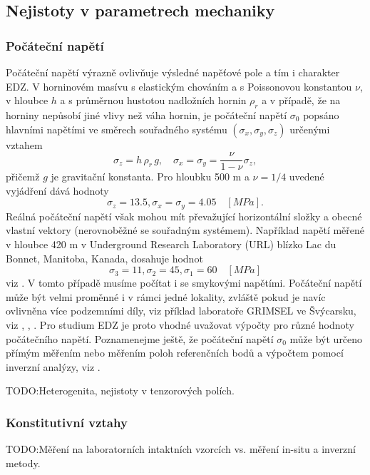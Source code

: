\documentclass{article}
\def\todo#1{{TODO:\color{violet}#1}}
\begin{document}
\subsection{Nejistoty v parametrech mechaniky}

\subsubsection{Počáteční napětí}
\label{sec:sigma0}
Počáteční napětí výrazně ovlivňuje výsledné napěťové pole a tím i charakter EDZ.
V horninovém masívu s elastickým chováním a s Poissonovou konstantou $\nu$, v hloubce $h$ a s průměrnou hustotou nadložních hornin $\rho_{r}$ a v případě,
že na horniny nepůsobí jiné vlivy než váha hornin, je počáteční napětí $\sigma_0$
popsáno hlavními napětími ve směrech souřadného systému $(\sigma_x, \sigma_y, \sigma_z)$ určenými vztahem
\begin{equation}
	\sigma_z = h\,\rho_{r}\, g, \quad \sigma_x = \sigma_y = \frac{\nu}{1-\nu} \sigma_z,
\end{equation}
přičemž $g$ je gravitační konstanta. Pro hloubku 500 m a $\nu = 1/4$ uvedené vyjádření dává hodnoty
$$
	\sigma_z = 13.5, \sigma_x = \sigma_y = 4.05\quad [MPa].
$$
Reálná počáteční napětí však mohou mít převažující horizontální složky a obecné vlastní vektory (nerovnoběžné se souřadným systémem). Například napětí měřené v hloubce 420 m v Underground Research Laboratory (URL) blízko Lac du Bonnet, Manitoba, Kanada, dosahuje hodnot
$$
	\sigma_3 = 11, \sigma_2 = 45, \sigma_1 = 60\quad [MPa]
$$
viz \cite{Rutqvist2009}. V tomto případě musíme počítat i se smykovými napětími. Počáteční napětí může být velmi proměnné i v rámci jedné lokality, zvláště pokud je navíc ovlivněna více podzemními díly, viz příklad laboratoře GRIMSEL ve Švýcarsku, viz \cite{Krietsch2019},
\cite{Stas2016}, \cite{Rutqvist2004}. Pro studium EDZ je proto vhodné uvažovat výpočty pro různé hodnoty počátečního napětí.
Poznamenejme  ještě, že počáteční napětí $\sigma_0$ může být určeno přímým měřením nebo měřením poloh referenčních bodů 
a výpočtem pomocí inverzní analýzy, viz \cite{Malik2021}.

\todo{Heterogenita, nejistoty v tenzorových polích.}


\subsubsection{Konstitutivní vztahy}



\todo{Měření na laboratorních intaktních vzorcích vs. měření in-situ a inverzní metody.}
\end{document}
